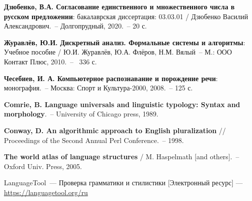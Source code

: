 \documentclass[oneside, final, 12pt]{article}
\theoremstyle{plain}
\theoremstyle{plain} %
\begin{document}

\begin{thebibliography}{500}
	

\textbf{ Дзюбенко, В.А. Согласование единственного и множественного числа в русском предложении}: бакалаврская диссертация: 03.03.01 / Дзюбенко Василий Александрович.~-- Долгопрудный, 2020.~-- 20 с.

\textbf{ Журавлёв, Ю.И. Дискретный анализ. Формальные системы и алгоритмы}: Учебное пособие / Ю.И. Журавлёв, Ю.А. Флёров, Н.М. Вялый~-- М.: ООО Контакт Плюс, 2010.~--~ 336 с.


 \textbf{Чесебиев, И. А. Компьютерное распознавание и порождение речи}: монография.~-- Москва: Спорт и Культура-2000, 2008.~-- 125 с.

 \textbf{Comrie, B. Language universals and linguistic typology: Syntax and morphology}.~-- University of Chicago press, 1989.

 \textbf{Conway, D. An algorithmic approach to English pluralization} // Proceedings of the Second Annual Perl Conference.~-- 1998.

 \textbf{The world atlas of language structures} / M. Haspelmath [and others].~-- Oxford Univ. Press, 2005.

 LanguageTool~--- Проверка грамматики и стилистики [Электронный ресурс] --- \href{https://languagetool.org/ru}{https://languagetool.org/ru}


\end{thebibliography}
\pagebreak

\appendix


\pagebreak

\end{document}
